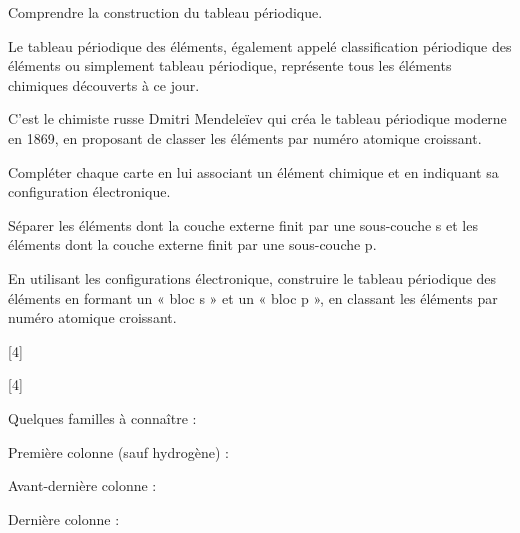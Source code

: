\teteSndAtom



\begin{objectifs}
  \item Comprendre la construction du tableau périodique.
\end{objectifs}

\begin{contexte}
  Le tableau périodique des éléments, également appelé classification périodique des éléments ou simplement tableau périodique, représente tous les éléments chimiques découverts à ce jour.
  
 C'est le chimiste russe Dmitri Mendeleïev qui créa le tableau périodique moderne en 1869, en proposant de classer les éléments par numéro atomique croissant.

\end{contexte}


\mesure
Compléter chaque carte en lui associant un élément chimique et en indiquant sa configuration électronique.

\mesure
Séparer les éléments dont la couche externe finit par une sous-couche s et les éléments dont la couche externe finit par une sous-couche p.

\mesure
En utilisant les configurations électronique, construire le tableau périodique des éléments en formant un « bloc s » et un « bloc p », en classant les éléments par numéro atomique croissant.


[4]

[4]

\begin{importants}
  Quelques familles à connaître : 
  \begin{listePoints}
    \item Première colonne (sauf hydrogène) : 
    \item Avant-dernière colonne : 
    \item Dernière colonne : 
  \end{listePoints}
\end{importants}

